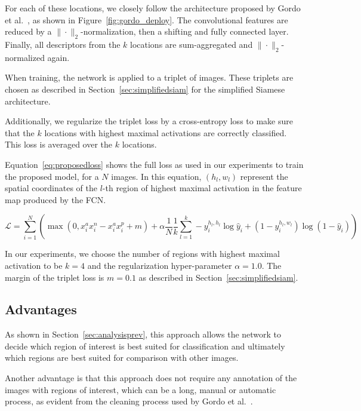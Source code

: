 For each of these locations, we closely follow the architecture
proposed by Gordo et al.~\cite{gordo_deep_2016}, as shown in
Figure~\ref{fig:gordo_deploy}. The convolutional features are
reduced by a $\|\cdot\|_2$-normalization, then a shifting and fully connected
layer. Finally, all descriptors from the $k$ locations are
sum-aggregated and $\|\cdot\|_2$-normalized again.

When training, the network is applied to a triplet of images.
These triplets are chosen as described in Section~\ref{sec:simplifiedsiam}
for the simplified Siamese architecture.

Additionally, we regularize the triplet loss by a cross-entropy loss
to make sure that the $k$ locations with highest
maximal activations are correctly classified. This loss is averaged over
the $k$ locations.

Equation~\ref{eq:proposedloss} shows the full loss as used in our
experiments to train the proposed model, for a $N$ images. In this
equation, $(h_l, w_l)$ represent the spatial coordinates of the $l$-th
region of highest maximal activation in the feature map produced by
the FCN.

\begin{equation}\label{eq:proposedloss}
\mathcal{L} = \sum_{i=1}^N \left( \max(0, x^a_i x^n_i - x^a_i x^p_i + m) +
\alpha \frac{1}{N} \frac{1}{k} \sum_{l=1}^k -
y_i^{h_l,h_l} \log \hat{y}_i + (1-y_i^{h_l,w_l}) \log (1-\hat{y}_i) \right)
\end{equation}

In our experiments, we choose the number of regions with highest maximal
activation to be $k=4$ and the regularization hyper-parameter $\alpha=1.0$.
The margin of the triplet loss is $m=0.1$ as described in
Section~\ref{sec:simplifiedsiam}.

\subsection{Advantages} %
As shown in Section~\ref{sec:analysisprev}, this approach
allows the network to decide which region of interest is
best suited for classification and ultimately which regions
are best suited for comparison with other images.

Another advantage is that this approach does not require
any annotation of the images with regions of interest,
which can be a long, manual or automatic process, as evident
from the cleaning process used by Gordo et al.~\cite{gordo_end--end_2016}.

